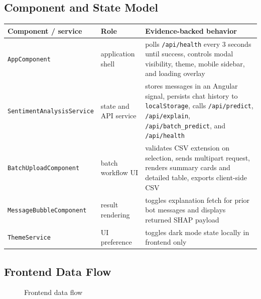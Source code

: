 \subsection{Component and State Model}
\begin{table}[H]
\centering
\begin{tabularx}{\textwidth}{@{}l l X@{}}
\toprule
\textbf{Component / service} & \textbf{Role} & \textbf{Evidence-backed behavior} \\
\midrule
\texttt{AppComponent} & application shell & polls \texttt{/api/health} every 3 seconds until success, controls modal visibility, theme, mobile sidebar, and loading overlay \\
\texttt{SentimentAnalysisService} & state and API service & stores messages in an Angular signal, persists chat history to \texttt{localStorage}, calls \texttt{/api/predict}, \texttt{/api/explain}, \texttt{/api/batch\_predict}, and \texttt{/api/health} \\
\texttt{BatchUploadComponent} & batch workflow UI & validates CSV extension on selection, sends multipart request, renders summary cards and detailed table, exports client-side CSV \\
\texttt{MessageBubbleComponent} & result rendering & toggles explanation fetch for prior bot messages and displays returned SHAP payload \\
\texttt{ThemeService} & UI preference & toggles dark mode state locally in frontend only \\
\bottomrule
\end{tabularx}
\end{table}

\subsection{Frontend Data Flow}
\begin{figure}[H]
\centering
{}
\caption{Frontend data flow}
\end{figure}

